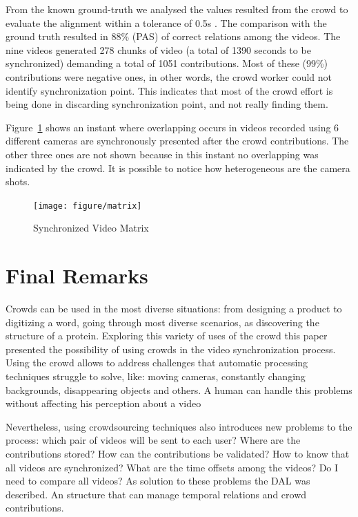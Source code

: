 \documentclass[sigconf]{acmart}
\begin{document}
From the known ground-truth we analysed the values resulted from the crowd to evaluate the alignment within a tolerance of 0.5s \cite{hal-01162603}. The comparison with the ground truth resulted in 88\% (PAS) of correct relations among the videos. The nine videos generated 278 chunks of video (a total of 1390 seconds to be synchronized) demanding a total of 1051 contributions. Most of these (99\%) contributions were negative ones, in other words, the crowd worker could not identify synchronization  point. This indicates that most of the crowd effort is being done in discarding synchronization point, and not really finding them.

Figure~\ref{interface} shows an instant where overlapping occurs in videos recorded using 6 different cameras are synchronously presented after the crowd contributions. The other three ones are not shown because in this instant no overlapping was indicated by the crowd. It is possible to notice how heterogeneous are the camera shots. 

\begin{figure}[h]
	\centerline{\texttt{[image: figure/matrix]}}
	\caption{Synchronized Video Matrix}
	\label{interface}
\end{figure}


\section{Final Remarks}

Crowds can be used in the most diverse situations: from designing a product to digitizing a word, going through most diverse scenarios, as discovering the structure of a protein. Exploring this variety of uses of the crowd this paper presented the possibility of using crowds in the video synchronization process. Using the crowd allows to address challenges that automatic processing techniques struggle to solve, like: moving cameras, constantly changing backgrounds, disappearing objects and others. A human can handle this problems without affecting his perception about a video

Nevertheless, using crowdsourcing techniques also introduces new problems to the process: which pair of videos will be sent to each user? Where are the contributions stored? How can the contributions be validated? How to know that all videos are synchronized? What are the time offsets among the videos? Do I need to compare all videos? As solution to these problems the DAL was described. An structure that can manage temporal relations and crowd contributions.
\end{document}
